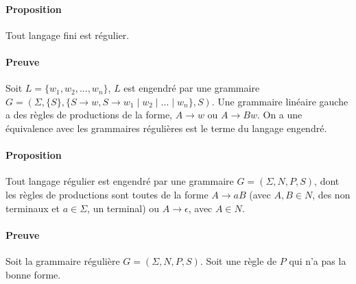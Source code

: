 \paragraph{Proposition} %
\label{par:proposition}

Tout langage fini est régulier.



\paragraph{Preuve} %
\label{par:preuve}

Soit $L = \{w_1, w_2, ... , w_n\}$, $L$ est engendré par une grammaire $G = (\Sigma , \{S\}, \{S \rightarrow w, S \rightarrow w_1 \mid w_2 \mid ... \mid w_n\},S)$.
Une grammaire linéaire gauche a des règles de productions de la forme, $A \rightarrow w$ ou $A \rightarrow Bw$. On a une équivalence avec les grammaires régulières est le terme du langage engendré.



\paragraph{Proposition} %
\label{par:proposition}

Tout langage régulier est engendré par une grammaire $G=(\Sigma,N,P,S)$, dont les règles de productions sont toutes de la forme $A \rightarrow aB$ (avec $A,B \in N$, des non terminaux et $a \in \Sigma$, un terminal) ou $A \rightarrow \epsilon$, avec $A \in N$.



\paragraph{Preuve} %
\label{par:preuve}

Soit la grammaire régulière $G=(\Sigma,N,P,S)$. Soit une règle de $P$ qui n'a pas la bonne forme.


